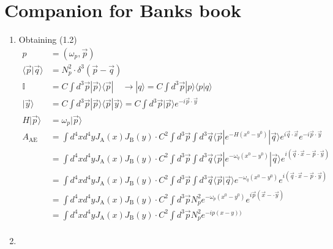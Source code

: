 \documentclass[10pt,a4paper]{article}
\theoremstyle{definition}
\begin{document}
\section{Companion for Banks book}
\begin{enumerate}
\item Obtaining (1.2)
\begin{align*}
    p &= (\omega_p,\vec{p})\\
    \langle\vec{p}|\vec{q}\rangle&=N_p^2\cdot\delta^3(\vec{p}-\vec{q})\\
    \mathbb{I} &=C\int d^3\vec{p}|\vec{p}\rangle\langle\vec{p}|\quad\rightarrow |q\rangle=C\int d^3\vec{p}|p\rangle\langle p|q\rangle\\
    |\vec{y}\rangle &=C\int d^3\vec{p}|\vec{p}\rangle\langle\vec{p}|\vec{y}\rangle=C\int d^3\vec{p}|\vec{p}\rangle e^{-i\vec{p}\cdot\vec{y}}\\
    H|\vec{p}\rangle&=\omega_p|\vec{p}\rangle\\
    A_\text{AE}&=\int d^4xd^4y J_\text{A}(x)J_\text{B}(y)\cdot C^2\int d^3\vec{p}\int d^3\vec{q}\langle\vec{p}|e^{-H(x^0-y^0)}|\vec{q}\rangle e^{i\vec{q}\cdot\vec{x}} e^{-i\vec{p}\cdot\vec{y}}\\
    &=\int d^4xd^4y J_\text{A}(x)J_\text{B}(y)\cdot C^2\int d^3\vec{p}\int d^3\vec{q}\langle\vec{p}|e^{-\omega_q(x^0-y^0)}|\vec{q}\rangle e^{i(\vec{q}\cdot\vec{x}-\vec{p}\cdot\vec{y})}\\
    &=\int d^4xd^4y J_\text{A}(x)J_\text{B}(y)\cdot C^2\int d^3\vec{p}\int d^3\vec{q}\langle\vec{p}|\vec{q}\rangle e^{-\omega_q(x^0-y^0)} e^{i(\vec{q}\cdot\vec{x}-\vec{p}\cdot\vec{y})}\\
    &=\int d^4xd^4y J_\text{A}(x)J_\text{B}(y)\cdot C^2\int d^3\vec{p}N_p^2 e^{-\omega_p(x^0-y^0)} e^{i\vec{p}(\vec{x}-\cdot\vec{y})}\\
    &=\int d^4xd^4y J_\text{A}(x)J_\text{B}(y)\cdot C^2\int d^3\vec{p}N_p^2 e^{-ip(x-y))}\\
\end{align*}
\item

\end{enumerate}

\newpage 
\end{document}
